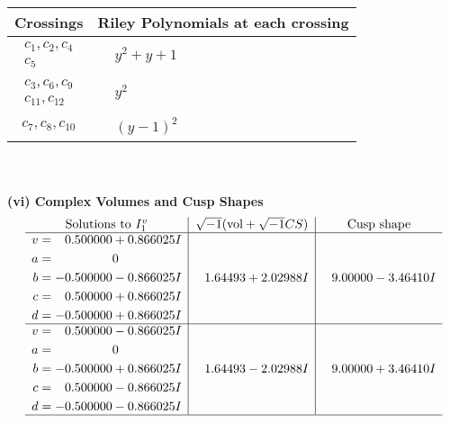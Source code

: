 \documentclass[1p]{elsarticle_modified}
\theoremstyle{definition}
\newcommand{\I}{\sqrt{-1}}
\begin{document}
\begin{tabular}{m{50pt}|m{274pt}}
Crossings & \hspace{64pt}Riley Polynomials at each crossing \\
\hline $$\begin{aligned}c_{1},c_{2},c_{4}\\c_{5}\end{aligned}$$&$\begin{aligned}
&y^2+y+1
\end{aligned}$\\
\hline $$\begin{aligned}c_{3},c_{6},c_{9}\\c_{11},c_{12}\end{aligned}$$&$\begin{aligned}
&y^2
\end{aligned}$\\
\hline $$\begin{aligned}c_{7},c_{8},c_{10}\end{aligned}$$&$\begin{aligned}
&(y-1)^2
\end{aligned}$\\
\hline
\end{tabular}\\~\\
\newpage\flushleft \textbf{(vi) Complex Volumes and Cusp Shapes}
$$\begin{array}{c|c|c}  
\text{Solutions to }I^v_{1}& \I (\text{vol} + \sqrt{-1}CS) & \text{Cusp shape}\\
 \hline 
\begin{aligned}
v &= \phantom{-}0.500000 + 0.866025 I \\
a &= \phantom{-0.000000 } 0 \\
b &= -0.500000 - 0.866025 I \\
c &= \phantom{-}0.500000 + 0.866025 I \\
d &= -0.500000 + 0.866025 I\end{aligned}
 & \phantom{-}1.64493 + 2.02988 I & \phantom{-}9.00000 - 3.46410 I \\ \hline\begin{aligned}
v &= \phantom{-}0.500000 - 0.866025 I \\
a &= \phantom{-0.000000 } 0 \\
b &= -0.500000 + 0.866025 I \\
c &= \phantom{-}0.500000 - 0.866025 I \\
d &= -0.500000 - 0.866025 I\end{aligned}
 & \phantom{-}1.64493 - 2.02988 I & \phantom{-}9.00000 + 3.46410 I\\
 \hline 
 \end{array}$$\newpage\newpage\renewcommand{\arraystretch}{1}
\end{document}

